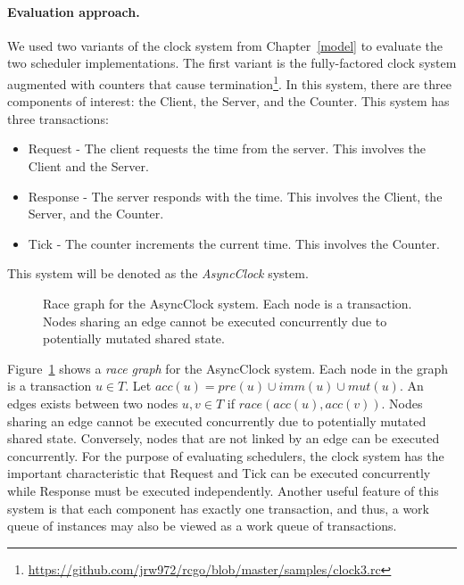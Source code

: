 \paragraph{Evaluation approach.}
We used two variants of the clock system from Chapter~\ref{model} to evaluate the two scheduler implementations.
The first variant is the fully-factored clock system augmented with counters that cause termination\footnote{\href{https://github.com/jrw972/rcgo/blob/master/samples/clock3.rc}{https://github.com/jrw972/rcgo/blob/master/samples/clock3.rc}}.
In this system, there are three components of interest:  the Client, the Server, and the Counter.
This system has three transactions:
\begin{itemize}
  \item Request - The client requests the time from the server.  This involves the Client and the Server.
  \item Response - The server responds with the time.  This involves the Client, the Server, and the Counter.
  \item Tick - The counter increments the current time.  This involves the Counter.
\end{itemize}
This system will be denoted as the \emph{AsyncClock} system.

\begin{figure}
\centering
{}%
\caption[Race graph for the AsyncClock system]{Race graph for the AsyncClock system.  Each node is a transaction.  Nodes sharing an edge cannot be executed concurrently due to potentially mutated shared state. \label{clock_system_mutex}}
\end{figure}

Figure~\ref{clock_system_mutex} shows a \emph{race graph} for the AsyncClock system.
Each node in the graph is a transaction $u \in T$.
Let $\mathit{acc}(u) = \mathit{pre}(u) \cup \mathit{imm}(u) \cup \mathit{mut}(u)$.
An edges exists between two nodes $u,v \in T$ if $\mathit{race}(\mathit{acc}(u), \mathit{acc}(v))$.
Nodes sharing an edge cannot be executed concurrently due to potentially mutated shared state.
Conversely, nodes that are not linked by an edge can be executed concurrently.
For the purpose of evaluating schedulers, the clock system has the important characteristic that Request and Tick can be executed concurrently while Response must be executed independently.
Another useful feature of this system is that each component has exactly one transaction, and thus, a  work queue of instances may also be viewed as a work queue of transactions.

